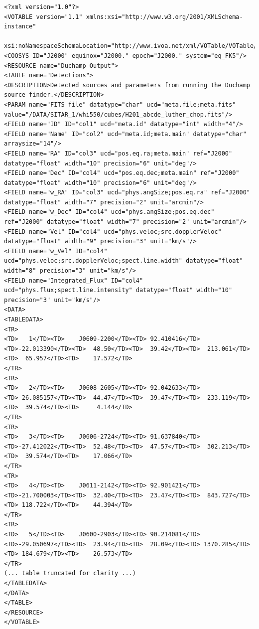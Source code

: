 \documentclass[12pt,a4paper]{article}
\begin{document}
\begin{landscape}
{\scriptsize
  \begin{verbatim}
<?xml version="1.0"?>
<VOTABLE version="1.1" xmlns:xsi="http://www.w3.org/2001/XMLSchema-instance"
 xsi:noNamespaceSchemaLocation="http://www.ivoa.net/xml/VOTable/VOTable/v1.1">
<COOSYS ID="J2000" equinox="J2000." epoch="J2000." system="eq_FK5"/>
<RESOURCE name="Duchamp Output">
<TABLE name="Detections">
<DESCRIPTION>Detected sources and parameters from running the Duchamp source finder.</DESCRIPTION>
<PARAM name="FITS file" datatype="char" ucd="meta.file;meta.fits" value="/DATA/SITAR_1/whi550/cubes/H201_abcde_luther_chop.fits"/>
<FIELD name="ID" ID="col1" ucd="meta.id" datatype="int" width="4"/>
<FIELD name="Name" ID="col2" ucd="meta.id;meta.main" datatype="char" arraysize="14"/>
<FIELD name="RA" ID="col3" ucd="pos.eq.ra;meta.main" ref="J2000" datatype="float" width="10" precision="6" unit="deg"/>
<FIELD name="Dec" ID="col4" ucd="pos.eq.dec;meta.main" ref="J2000" datatype="float" width="10" precision="6" unit="deg"/>
<FIELD name="w_RA" ID="col3" ucd="phys.angSize;pos.eq.ra" ref="J2000" datatype="float" width="7" precision="2" unit="arcmin"/>
<FIELD name="w_Dec" ID="col4" ucd="phys.angSize;pos.eq.dec" ref="J2000" datatype="float" width="7" precision="2" unit="arcmin"/>
<FIELD name="Vel" ID="col4" ucd="phys.veloc;src.dopplerVeloc" datatype="float" width="9" precision="3" unit="km/s"/>
<FIELD name="w_Vel" ID="col4" ucd="phys.veloc;src.dopplerVeloc;spect.line.width" datatype="float" width="8" precision="3" unit="km/s"/>
<FIELD name="Integrated_Flux" ID="col4" ucd="phys.flux;spect.line.intensity" datatype="float" width="10" precision="3" unit="km/s"/>
<DATA>
<TABLEDATA>
<TR>
<TD>   1</TD><TD>    J0609-2200</TD><TD> 92.410416</TD><TD>-22.013390</TD><TD>  48.50</TD><TD>  39.42</TD><TD>  213.061</TD><TD>  65.957</TD><TD>    17.572</TD>
</TR>
<TR>
<TD>   2</TD><TD>    J0608-2605</TD><TD> 92.042633</TD><TD>-26.085157</TD><TD>  44.47</TD><TD>  39.47</TD><TD>  233.119</TD><TD>  39.574</TD><TD>     4.144</TD>
</TR>
<TR>
<TD>   3</TD><TD>    J0606-2724</TD><TD> 91.637840</TD><TD>-27.412022</TD><TD>  52.48</TD><TD>  47.57</TD><TD>  302.213</TD><TD>  39.574</TD><TD>    17.066</TD>
</TR>
<TR>
<TD>   4</TD><TD>    J0611-2142</TD><TD> 92.901421</TD><TD>-21.700003</TD><TD>  32.40</TD><TD>  23.47</TD><TD>  843.727</TD><TD> 118.722</TD><TD>    44.394</TD>
</TR>
<TR>
<TD>   5</TD><TD>    J0600-2903</TD><TD> 90.214081</TD><TD>-29.050697</TD><TD>  23.94</TD><TD>  28.09</TD><TD> 1370.285</TD><TD> 184.679</TD><TD>    26.573</TD>
</TR>
(... table truncated for clarity ...)
</TABLEDATA>
</DATA>
</TABLE>
</RESOURCE>
</VOTABLE>
  \end{verbatim}
}
\end{landscape}
\end{document}
